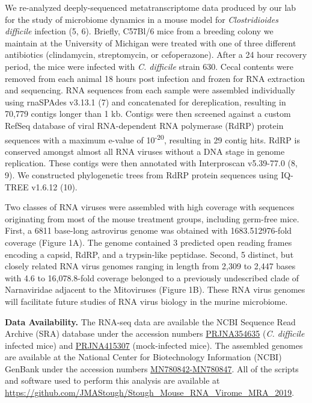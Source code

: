 \documentclass[11pt,]{article}
\begin{document}
We re-analyzed deeply-sequenced metatranscriptome data produced by our
lab for the study of microbiome dynamics in a mouse model for
\emph{Clostridioides difficile} infection (5, 6). Briefly, C57Bl/6 mice
from a breeding colony we maintain at the University of Michigan were
treated with one of three different antibiotics (clindamycin,
streptomycin, or cefoperazone). After a 24 hour recovery period, the
mice were infected with \emph{C. difficile} strain 630. Cecal contents
were removed from each animal 18 hours post infection and frozen for RNA
extraction and sequencing. RNA sequences from each sample were assembled
individually using rnaSPAdes v3.13.1 (7) and concatenated for
dereplication, resulting in 70,779 contigs longer than 1 kb. Contigs
were then screened against a custom RefSeq database of viral
RNA-dependent RNA polymerase (RdRP) protein sequences with a maximum
e-value of 10\textsuperscript{-20}, resulting in 29 contig hits. RdRP is
conserved amongst almost all RNA viruses without a DNA stage in genome
replication. These contigs were then annotated with Interproscan
v5.39-77.0 (8, 9). We constructed phylogenetic trees from RdRP protein
sequences using IQ-TREE v1.6.12 (10).

Two classes of RNA viruses were assembled with high coverage with
sequences originating from most of the mouse treatment groups, including
germ-free mice. First, a 6811 base-long astrovirus genome was obtained
with 1683.512976-fold coverage (Figure 1A). The genome contained 3
predicted open reading frames encoding a capsid, RdRP, and a
trypsin-like peptidase. Second, 5 distinct, but closely related RNA
virus genomes ranging in length from 2,309 to 2,447 bases with 4.6 to
16,078.8-fold coverage belonged to a previously undescribed clade of
Narnaviridae adjacent to the Mitoviruses (Figure 1B). These RNA virus
genomes will facilitate future studies of RNA virus biology in the
murine microbiome.

\textbf{Data Availability.} The RNA-seq data are available the NCBI
Sequence Read Archive (SRA) database under the accession numbers
\href{https://www.ncbi.nlm.nih.gov/bioproject/354635}{PRJNA354635}
(\emph{C. difficile} infected mice) and
\href{https://www.ncbi.nlm.nih.gov/bioproject/415307}{PRJNA415307}
(mock-infected mice). The assembled genomes are available at the
National Center for Biotechnology Information (NCBI) GenBank under the
accession numbers \href{}{MN780842-MN780847}. All of the scripts and
software used to perform this analysis are available at
\url{https://github.com/JMAStough/Stough_Mouse_RNA_Virome_MRA_2019}.
\end{document}

